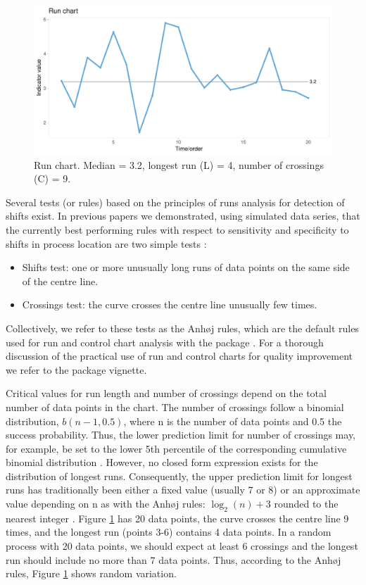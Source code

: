 \begin{figure}[htbp]
  \centering
  \includegraphics[width=\textwidth]{fig_run.pdf}
  \caption{Run chart. Median = 3.2, longest run (L) = 4, number of crossings (C) = 9.}
  \label{figure:run}
\end{figure}

Several tests (or rules) based on the principles of runs analysis for
detection of shifts exist. In previous papers we demonstrated, using
simulated data series, that the currently best performing rules with
respect to sensitivity and specificity to shifts in process location are
two simple tests \citep{anhoej2014, anhoej2015, anhoej2018}:

\begin{itemize}
\item
  Shifts test: one or more unusually long runs of data points on the
  same side of the centre line.
\item
  Crossings test: the curve crosses the centre line unusually few times.
\end{itemize}

Collectively, we refer to these tests as the Anhøj rules, which are the
default rules used for run and control chart analysis with the
 package \citep{qicharts2}. For a thorough discussion
of the practical use of run and control charts for quality improvement
we refer to the  package vignette.

Critical values for run length and number of crossings depend on the
total number of data points in the chart. The number of crossings follow
a binomial distribution, \(b(n - 1, 0.5)\), where n is the number of
data points and 0.5 the success probability. Thus, the lower prediction
limit for number of crossings may, for example, be set to the lower 5th
percentile of the corresponding cumulative binomial distribution
\citep{chen2010}. However, no closed form expression exists for the
distribution of longest runs. Consequently, the upper prediction limit
for longest runs has traditionally been either a fixed value (usually 7
or 8) \citep{carey2002a} or an approximate value depending on n as with
the Anhøj rules: \(\log_2(n) + 3\) rounded to the nearest integer
\citep{schilling2012}. Figure \ref{figure:run} has 20 data points, the
curve crosses the centre line 9 times, and the longest run (points 3-6)
contains 4 data points. In a random process with 20 data points, we
should expect at least 6 crossings and the longest run should include no
more than 7 data points. Thus, according to the Anhøj rules, Figure
\ref{figure:run} shows random variation.

